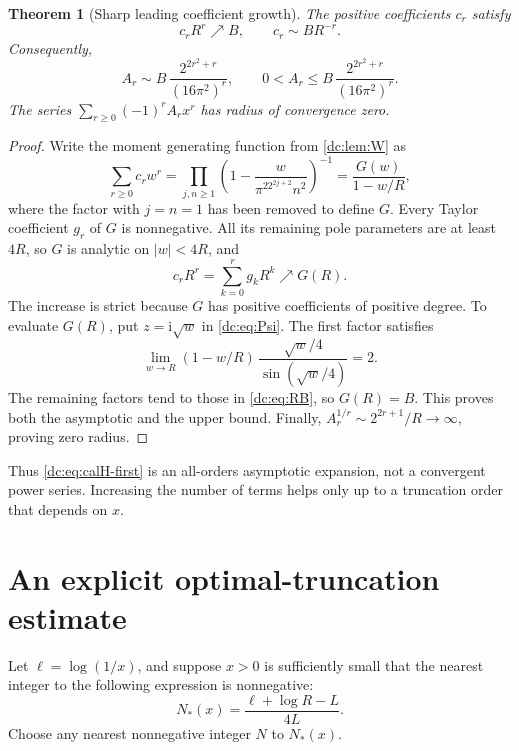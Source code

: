\documentclass[11pt,a4paper,oneside,openany]{book}
\numberwithin{equation}{chapter}
\newtheorem{theorem}{Theorem}[chapter]
\theoremstyle{definition}
\theoremstyle{remark}
\newcommand{\ii}{\mathrm i}
\newcommand{\abs}[1]{\left\lvert #1\right\rvert}
\begin{document}
\begin{theorem}[Sharp leading coefficient growth]
\label{dc:thm:c-asymptotic}
The positive coefficients $c_r$ satisfy
\begin{equation}
 c_rR^r\nearrow B,
 \qquad
 c_r\sim BR^{-r}.
 \label{dc:eq:c-asymptotic}
\end{equation}
Consequently,
\begin{equation}
 A_r\sim B\,\frac{2^{2r^2+r}}{(16\pi^2)^r},
 \qquad
 0<A_r\le B\,\frac{2^{2r^2+r}}{(16\pi^2)^r}.
 \label{dc:eq:A-asymptotic}
\end{equation}
The series $\sum_{r\ge0}(-1)^rA_rx^r$ has radius of convergence zero.
\end{theorem}
\begin{proof}
Write the moment generating function from \cref{dc:lem:W} as
\[
 \sum_{r\ge0}c_rw^r
 =\prod_{j,n\ge1}\left(1-\frac{w}{\pi^22^{2j+2}n^2}\right)^{-1}
 =\frac{G(w)}{1-w/R},
\]
where the factor with $j=n=1$ has been removed to define $G$.
Every Taylor coefficient $g_r$ of $G$ is nonnegative. All its
remaining pole parameters are at least $4R$, so $G$ is analytic
on $\abs w<4R$, and
\[
 c_rR^r=\sum_{k=0}^rg_kR^k\nearrow G(R).
\]
The increase is strict because $G$ has positive coefficients of
positive degree. To evaluate $G(R)$, put $z=\ii\sqrt w$ in
\cref{dc:eq:Psi}. The first factor satisfies
\[
 \lim_{w\to R}(1-w/R)\,
 \frac{\sqrt w/4}{\sin(\sqrt w/4)}=2.
\]
The remaining factors tend to those in \cref{dc:eq:RB}, so $G(R)=B$.
This proves both the asymptotic and the upper bound. Finally,
$A_r^{1/r}\sim 2^{2r+1}/R\to\infty$, proving zero radius.
\end{proof}

Thus \cref{dc:eq:calH-first} is an all-orders asymptotic expansion, not
a convergent power series. Increasing the number of terms helps only
up to a truncation order that depends on $x$.

\section{An explicit optimal-truncation estimate}
Let $\ell=\log(1/x)$, and suppose $x>0$ is sufficiently small that
the nearest integer to the following expression is nonnegative:
\begin{equation}
 N_*(x)=\frac{\ell+\log R-L}{4L}.
 \label{dc:eq:Nstar}
\end{equation}
Choose any nearest nonnegative integer $N$ to $N_*(x)$.
\end{document}
